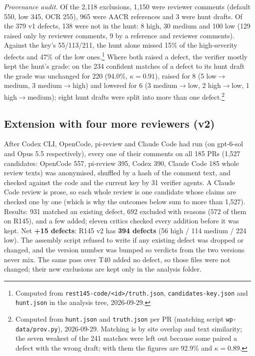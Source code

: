 \documentclass[11pt,a4paper]{article}
\newcommand{\code}[1]{\texttt{#1}}
\begin{document}
\emph{Provenance audit.} Of the 2{,}118 exclusions, 1{,}150 were reviewer
comments (default 550, low 345, OCR 255), 965 were AACR references and 3
were hunt drafts. Of the 379 v1 defects, 138 were not in the hunt: 8 high,
30 medium and 100 low (129 raised only by reviewer comments, 9 by a
reference and reviewer comments). Against the key's 55/113/211, the hunt
alone missed 15\% of the high-severity defects and 47\% of the low
ones.\footnote{Computed from \code{rest145-code/<id>/truth.json},
\code{candidates-key.json} and \code{hunt.json} in the analysis tree,
2026-09-29.} Where both raised a defect, the verifier mostly kept the
hunt's grade: on the 234 confident matches of a defect to its hunt draft the
grade was unchanged for 220 (94.0\%, $\kappa = 0.91$), raised for 8 (5
low$\to$medium, 3 medium$\to$high) and lowered for 6 (3 medium$\to$low, 2
high$\to$low, 1 high$\to$medium); eight hunt drafts were split into more
than one defect.\footnote{Computed from \code{hunt.json} and
\code{truth.json} per PR (matching script \code{wp-data/prov.py}),
2026-09-29. Matching is by site overlap and text similarity; the seven
weakest of the 241 matches were left out because some paired a defect with
the wrong draft; with them the figures are 92.9\% and $\kappa = 0.89$.}

\subsection{Extension with four more reviewers (v2)}

After Codex CLI, OpenCode, pi-review and Claude Code had run (on gpt-6-sol
and Opus 5.5 respectively), every one of their comments on all 185 PRs
(1{,}527 candidates: OpenCode 557, pi-review 395, Codex 390, Claude Code 185
whole review texts) was anonymised, shuffled by a hash of the comment text,
and checked against the code and the current key by 31 verifier agents. A
Claude Code review is prose, so each whole review is one candidate whose
claims are checked one by one (which is why the outcomes below sum to more
than 1{,}527). Results: 931 matched an existing defect, 692 excluded with
reasons (572 of them on R145), and a few added; eleven critics checked
every addition before it was kept. Net \textbf{+15
defects}: R145 v2 has \textbf{394 defects} (56 high / 114 medium / 224 low).
The assembly script refused to write if any existing defect was dropped or
changed, and the version number was bumped so verdicts from the two versions
never mix. The same pass over T40 added no defect, so those files were not
changed; their new exclusions are kept only in the analysis folder.
\end{document}
